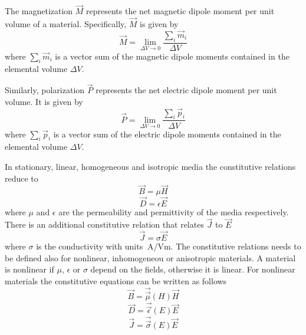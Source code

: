 \documentclass[11pt,a4paper,oneside]{book}
\numberwithin{equation}{section}
\theoremstyle{it}
\theoremstyle{definition}
\begin{document}
The magnetization $\vec{M}$ represents the net magnetic dipole moment per unit volume of a material. Specifically, $\vec{M}$ is given by
 \begin{equation}\label{}
 	\vec{M}=\lim_{\Delta V\rightarrow 0}\frac{\sum_{i}\vec{m}_i}{\Delta V}
 \end{equation}
where $\sum_{i}\vec{m}_i$ is a vector sum of the magnetic dipole moments contained in the elemental volume $\Delta V$. 

Similarly, polarization $\vec{P}$ represents the net electric dipole moment per unit volume. It is given by
  \begin{equation}\label{}
 	\vec{P}=\lim_{\Delta V\rightarrow 0}\frac{\sum_{i}\vec{p}_i}{\Delta V}
 \end{equation}
where $\sum_{i}\vec{p}_i$ is a vector sum of the electric dipole moments contained in the elemental volume $\Delta V$.

In stationary, linear, homogeneous and isotropic media the constitutive relations reduce to
\begin{equation}\label{constitutive_3}
	\vec{B}=\mu\vec{H}
\end{equation}
\begin{equation}\label{constitutive_4}
	\vec{D}=\epsilon\vec{E}
\end{equation}
where $\mu$ and $\epsilon$ are the permeability and permittivity of the media respectively. There is an additional constitutive relation that relates $\vec{J}$ to $\vec{E}$
\begin{equation}\label{constitutive_5}
	\vec{J}=\sigma\vec{E}
\end{equation}
where $\sigma$ is the conductivity with units $\SI{}{\ampere\per\volt\meter}$.
The constitutive relations needs to be defined also for nonlinear, inhomogeneou or anisotropic materials. A material is nonlinear if $\mu$, $\epsilon$ or $\sigma$ depend on the fields, otherwise it is linear. For nonlinear materials the constitutive equations can be written as follows
\begin{equation}\label{constitutive_6}
	\vec{B}=\vec{\vec{\mu}}(H)\vec{H}
\end{equation}
\begin{equation}\label{constitutive_7}
	\vec{D}=\vec{\vec{\epsilon}}(E)\vec{E}
\end{equation}
\begin{equation}\label{constitutive_8}
	\vec{J}=\vec{\vec{\sigma}}(E)\vec{E}
\end{equation}
\end{document}
